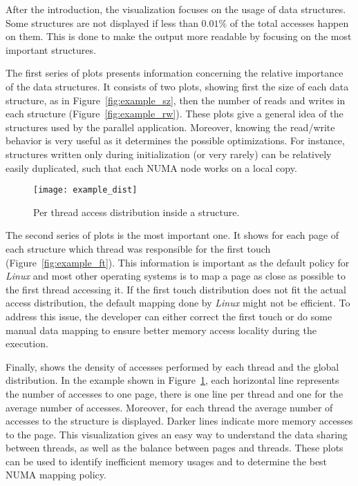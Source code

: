 After the introduction, the visualization focuses on the usage of data structures. Some
structures are not displayed if less than $0.01\%$ of the total accesses happen on them. This is
done to make the output more readable by focusing on the most important structures.

The first series of plots presents information concerning the relative
importance of the data structures. It consists of two plots, showing first the
size of each data structure, as in Figure~\ref{fig:example_sz}, then the
number of reads and writes  in each structure (Figure~\ref{fig:example_rw}). These plots give a
general idea of the structures used by the parallel application.
Moreover, knowing the read/write behavior is very
useful as it determines the possible optimizations. For instance, structures
written only during initialization (or very rarely) can be relatively easily
duplicated, such that each NUMA node works on a local copy.

\begin{figure}[!htb]
    \centering
    \texttt{[image: example\_dist]}
    \caption{Per thread access distribution inside a structure.}
    \label{fig:example_dist}
\end{figure}

The second series of plots is the most important one. It
shows for each page of each structure
which thread was responsible for the first touch
(Figure~\ref{fig:example_ft}). This information is important as the
default policy for \emph{Linux} and most other operating systems is to map a page as close as possible to the first
thread accessing it. If the first touch distribution does not fit the actual
access distribution, the default mapping done by \emph{Linux} might not be
efficient. To address this issue, the developer can either correct the first
touch or do some manual data mapping to ensure better memory access locality
during the execution.

Finally, \TABARNAC shows the density of accesses performed by each thread and
the global distribution. In the example shown in Figure~\ref{fig:example_dist}, each
horizontal line represents the number of accesses to one page, there is one
line per thread and one for the average number of accesses. Moreover, for each
thread the average number of accesses to the structure is displayed.
Darker lines indicate more memory accesses to the page. This visualization gives an easy way
to understand the data sharing between threads, as well as the balance between pages and
threads. These plots can be used to identify inefficient memory usages and to
determine the best NUMA mapping policy.

